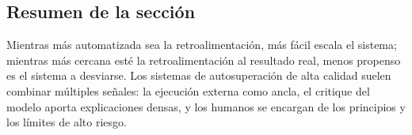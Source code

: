 \subsection{Resumen de la sección}

Mientras más automatizada sea la retroalimentación, más fácil escala el sistema; mientras más cercana esté la retroalimentación al resultado real, menos propenso es el sistema a desviarse. Los sistemas de autosuperación de alta calidad suelen combinar múltiples señales: la ejecución externa como ancla, el critique del modelo aporta explicaciones densas, y los humanos se encargan de los principios y los límites de alto riesgo.

